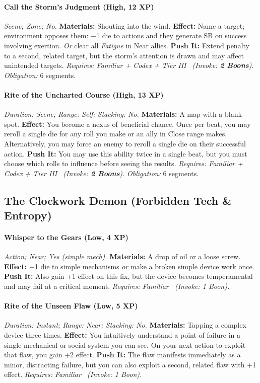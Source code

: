 \paragraph{Call the Storm's Judgment (High, 12 XP)} \emph{Scene; Zone; No.}
\textbf{Materials:} Shouting into the wind.
\textbf{Effect:} Name a target; environment opposes them: −1 die to actions and they generate SB on success involving exertion. \emph{Or} clear all \emph{Fatigue} in Near allies.
\textbf{Push It:} Extend penalty to a second, related target, but the storm's attention is drawn and may affect unintended targets.
\emph{Requires: Familiar + Codex + Tier III \ (\textit{Invoke:} \textbf{2 Boons}).}
\emph{Obligation:} 6 segments.

\paragraph{Rite of the Uncharted Course (High, 13 XP)} \emph{Duration: Scene; Range: Self; Stacking: No.}
\textbf{Materials:} A map with a blank spot.
\textbf{Effect:} You become a nexus of beneficial chance. Once per beat, you may reroll a single die for any roll you make or an ally in Close range makes. Alternatively, you may force an enemy to reroll a single die on their successful action.
\textbf{Push It:} You may use this ability twice in a single beat, but you must choose which rolls to influence before seeing the results.
\emph{Requires: Familiar + Codex + Tier III \ (\textit{Invoke:} \textbf{2 Boons}).}
\emph{Obligation:} 6 segments.

\subsection{The Clockwork Demon (Forbidden Tech \& Entropy)}
\paragraph{Whisper to the Gears (Low, 4 XP)} \emph{Action; Near; Yes (simple mech).}
\textbf{Materials:} A drop of oil or a loose screw.
\textbf{Effect:} +1 die to simple mechanisms \emph{or} make a broken simple device work once.
\textbf{Push It:} Also gain +1 effect on this fix, but the device becomes temperamental and may fail at a critical moment.
\emph{Requires: Familiar \ (\textit{Invoke:} 1 Boon).}
\paragraph{Rite of the Unseen Flaw (Low, 5 XP)} \emph{Duration: Instant; Range: Near; Stacking: No.}
\textbf{Materials:} Tapping a complex device three times.
\textbf{Effect:} You intuitively understand a point of failure in a single mechanical or social system you can see. On your next action to exploit that flaw, you gain +2 effect.
\textbf{Push It:} The flaw manifests immediately as a minor, distracting failure, but you can also exploit a second, related flaw with +1 effect.
\emph{Requires: Familiar \ (\textit{Invoke:} 1 Boon).}
